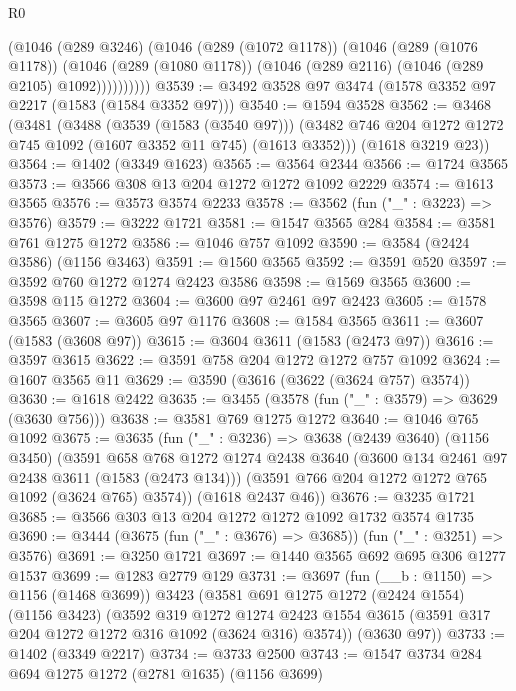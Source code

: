\begin{lexlean}{R0}
\begin{coremodule}
            (@1046
              (@289 @3246)
              (@1046
                (@289 (@1072 @1178))
                (@1046
                  (@289 (@1076 @1178))
                  (@1046
                    (@289 (@1080 @1178))
                    (@1046 (@289 @2116) (@1046 (@289 @2105) @1092))))))))))
@3539 := @3492 @3528 @97 @3474 (@1578 @3352 @97 @2217 (@1583 (@1584 @3352 @97)))
@3540 := @1594 @3528
@3562 := @3468
    (@3481
      (@3488
        (@3539 (@1583 (@3540 @97)))
        (@3482 @746 @204 @1272 @1272 @745 @1092 (@1607 @3352 @11 @745) (@1613 @3352)))
      (@1618 @3219 @23))
@3564 := @1402 (@3349 @1623)
@3565 := @3564 @2344
@3566 := @1724 @3565
@3573 := @3566 @308 @13 @204 @1272 @1272 @1092 @2229
@3574 := @1613 @3565
@3576 := @3573 @3574 @2233
@3578 := @3562 (fun ("_" : @3223) => @3576)
@3579 := @3222 @1721
@3581 := @1547 @3565 @284
@3584 := @3581 @761 @1275 @1272
@3586 := @1046 @757 @1092
@3590 := @3584 (@2424 @3586) (@1156 @3463)
@3591 := @1560 @3565
@3592 := @3591 @520
@3597 := @3592 @760 @1272 @1274 @2423 @3586
@3598 := @1569 @3565
@3600 := @3598 @115 @1272
@3604 := @3600 @97 @2461 @97 @2423
@3605 := @1578 @3565
@3607 := @3605 @97 @1176
@3608 := @1584 @3565
@3611 := @3607 (@1583 (@3608 @97))
@3615 := @3604 @3611 (@1583 (@2473 @97))
@3616 := @3597 @3615
@3622 := @3591 @758 @204 @1272 @1272 @757 @1092
@3624 := @1607 @3565 @11
@3629 := @3590 (@3616 (@3622 (@3624 @757) @3574))
@3630 := @1618 @2422
@3635 := @3455 (@3578 (fun ("_" : @3579) => @3629 (@3630 @756)))
@3638 := @3581 @769 @1275 @1272
@3640 := @1046 @765 @1092
@3675 := @3635
    (fun ("_" : @3236) =>
    @3638
      (@2439 @3640)
      (@1156 @3450)
      (@3591
        @658
        @768
        @1272
        @1274
        @2438
        @3640
        (@3600 @134 @2461 @97 @2438 @3611 (@1583 (@2473 @134)))
        (@3591 @766 @204 @1272 @1272 @765 @1092 (@3624 @765) @3574))
      (@1618 @2437 @46))
@3676 := @3235 @1721
@3685 := @3566 @303 @13 @204 @1272 @1272 @1092 @1732 @3574 @1735
@3690 := @3444 (@3675 (fun ("_" : @3676) => @3685)) (fun ("_" : @3251) => @3576)
@3691 := @3250 @1721
@3697 := @1440 @3565 @692 @695 @306 @1277 @1537
@3699 := @1283 @2779 @129
@3731 := @3697
    (fun (__b : @1150) => @1156 (@1468 @3699))
    @3423
    (@3581
      @691
      @1275
      @1272
      (@2424 @1554)
      (@1156 @3423)
      (@3592
        @319
        @1272
        @1274
        @2423
        @1554
        @3615
        (@3591 @317 @204 @1272 @1272 @316 @1092 (@3624 @316) @3574))
      (@3630 @97))
@3733 := @1402 (@3349 @2217)
@3734 := @3733 @2500
@3743 := @1547 @3734 @284 @694 @1275 @1272 (@2781 @1635) (@1156 @3699)

\end{coremodule}
\end{lexlean}

